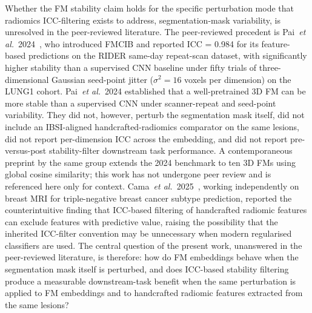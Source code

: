 Whether the FM stability claim holds for the specific perturbation mode that radiomics ICC-filtering exists to address, segmentation-mask variability, is unresolved in the peer-reviewed literature. The peer-reviewed precedent is Pai~\textit{et al.}~2024~\cite{pai2024}, who introduced FMCIB and reported ICC = 0.984 for its feature-based predictions on the RIDER same-day repeat-scan dataset, with significantly higher stability than a supervised CNN baseline under fifty trials of three-dimensional Gaussian seed-point jitter ($\sigma^2 = 16$ voxels per dimension) on the LUNG1 cohort. Pai~\textit{et al.}~2024 established that a well-pretrained 3D FM can be more stable than a supervised CNN under scanner-repeat and seed-point variability. They did not, however, perturb the segmentation mask itself, did not include an IBSI-aligned handcrafted-radiomics comparator on the same lesions, did not report per-dimension ICC across the embedding, and did not report pre-versus-post stability-filter downstream task performance. A contemporaneous preprint by the same group extends the 2024 benchmark to ten 3D FMs using global cosine similarity; this work has not undergone peer review and is referenced here only for context. Cama~\textit{et al.}~2025~\cite{cama2025}, working independently on breast MRI for triple-negative breast cancer subtype prediction, reported the counterintuitive finding that ICC-based filtering of handcrafted radiomic features can exclude features with predictive value, raising the possibility that the inherited ICC-filter convention may be unnecessary when modern regularised classifiers are used. The central question of the present work, unanswered in the peer-reviewed literature, is therefore: how do FM embeddings behave when the segmentation mask itself is perturbed, and does ICC-based stability filtering produce a measurable downstream-task benefit when the same perturbation is applied to FM embeddings and to handcrafted radiomic features extracted from the same lesions?

